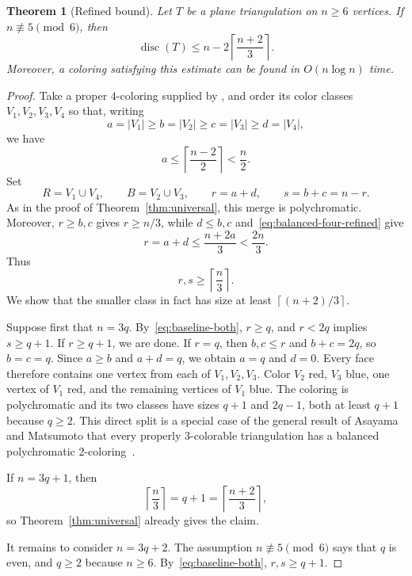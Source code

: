 \documentclass[11pt]{amsart}
\newtheorem{theorem}{Theorem}[section]
\newcommand{\disc}{\operatorname{disc}}
\newcommand{\ceil}[1]{\left\lceil #1\right\rceil}
\begin{document}
\begin{theorem}[Refined bound]\label{thm:refined}
Let $T$ be a plane triangulation on $n\ge6$ vertices.  If
$n\not\equiv5\pmod6$, then
\begin{equation}\label{eq:refined}
  \disc(T)\le n-2\ceil{\frac{n+2}{3}}.
\end{equation}
Moreover, a coloring satisfying this estimate can be found in $O(n\log n)$ time.
\end{theorem}

\begin{proof}
Take a proper $4$-coloring supplied by
\cite[Corollary~17]{KawarabayashiEtAl2026}, and order its color classes
$V_1,V_2,V_3,V_4$ so that, writing
\[
  a=|V_1|\ge b=|V_2|\ge c=|V_3|\ge d=|V_4|,
\]
we have
\begin{equation}\label{eq:balanced-four-refined}
  a\le\ceil{\frac{n-2}{2}}<\frac n2.
\end{equation}
Set
\[
  R=V_1\cup V_4,
  \qquad
  B=V_2\cup V_3,
  \qquad
  r=a+d,
  \qquad
  s=b+c=n-r.
\]
As in the proof of Theorem~\ref{thm:universal}, this merge is
polychromatic.  Moreover, $r\ge b,c$ gives $r\ge n/3$, while
$d\le b,c$ and~\eqref{eq:balanced-four-refined} give
\[
  r=a+d\le\frac{n+2a}{3}<\frac{2n}{3}.
\]
Thus
\begin{equation}\label{eq:baseline-both}
  r,s\ge\ceil{\frac n3}.
\end{equation}
We show that the smaller class in fact has size at least
$\ceil{(n+2)/3}$.

Suppose first that $n=3q$.  By~\eqref{eq:baseline-both}, $r\ge q$,
and $r<2q$ implies $s\ge q+1$.  If $r\ge q+1$, we are done.  If
$r=q$, then $b,c\le r$ and $b+c=2q$, so $b=c=q$.  Since $a\ge b$
and $a+d=q$, we obtain $a=q$ and $d=0$.  Every face therefore contains
one vertex from each of $V_1,V_2,V_3$.  Color $V_2$ red, $V_3$ blue,
one vertex of $V_1$ red, and the remaining vertices of $V_1$ blue.  The
coloring is polychromatic and its two classes have sizes $q+1$ and
$2q-1$, both at least $q+1$ because $q\ge2$.  This direct split is a special case of the general result of Asayama and
Matsumoto that every properly $3$-colorable triangulation has a balanced
polychromatic $2$-coloring~\cite{AsayamaMatsumoto2022}.

If $n=3q+1$, then
\[
  \ceil{\frac n3}=q+1=\ceil{\frac{n+2}{3}},
\]
so Theorem~\ref{thm:universal} already gives the claim.

It remains to consider $n=3q+2$.  The assumption
$n\not\equiv5\pmod6$ says that $q$ is even, and $q\ge2$ because
$n\ge6$.  By~\eqref{eq:baseline-both}, $r,s\ge q+1$.


\end{proof}
\end{document}
